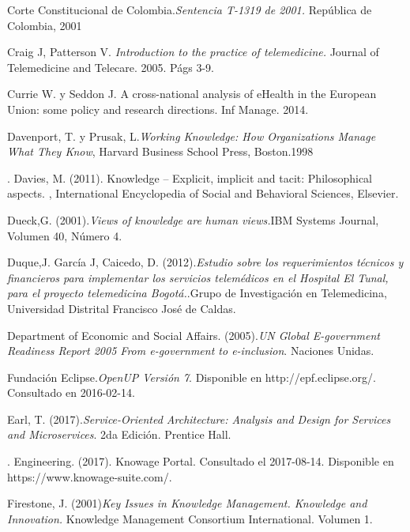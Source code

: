 \begin{thebibliography}{}
 Corte Constitucional de Colombia.\textit{Sentencia T-1319 de 2001.} República de Colombia, 2001

 Craig J, Patterson V. \textit{Introduction to the practice of telemedicine.} Journal of Telemedicine and Telecare. 2005. Págs 3-9.

 Currie W. y Seddon J. A cross-national analysis of eHealth in the European Union: some policy and research directions. Inf Manage. 2014.

 Davenport, T. y Prusak, L.\textit{Working Knowledge: How Organizations Manage What They Know}, Harvard Business School Press, Boston.1998

. Davies, M. (2011). Knowledge – Explicit, implicit and tacit: Philosophical aspects. , International Encyclopedia of Social and Behavioral Sciences, Elsevier.

 Dueck,G. (2001).\textit{Views of knowledge are human views.}IBM Systems Journal, Volumen 40, Número 4.

 Duque,J. García J, Caicedo, D. (2012).\textit{Estudio sobre los requerimientos técnicos y financieros para implementar los servicios telemédicos en el Hospital El Tunal,  para el proyecto telemedicina Bogotá.}.Grupo de Investigación en Telemedicina,  Universidad Distrital Francisco José de Caldas.

 Department of Economic and Social Affairs. (2005).\textit{UN Global E-government Readiness Report 2005 From e-government to e-inclusion}. Naciones Unidas.

 Fundación Eclipse.\textit{OpenUP Versión 7}. Disponible en http://epf.eclipse.org/. Consultado en 2016-02-14.


 Earl, T. (2017).\textit{Service-Oriented Architecture: Analysis and Design for Services and Microservices}. 2da Edición. Prentice Hall.

. Engineering. (2017). Knowage Portal. Consultado el 2017-08-14. Disponible en https://www.knowage-suite.com/.

 Firestone, J. (2001)\textit{Key Issues in Knowledge Management. Knowledge and Innovation.} Knowledge Management Consortium International. Volumen 1. 


\end{thebibliography}
